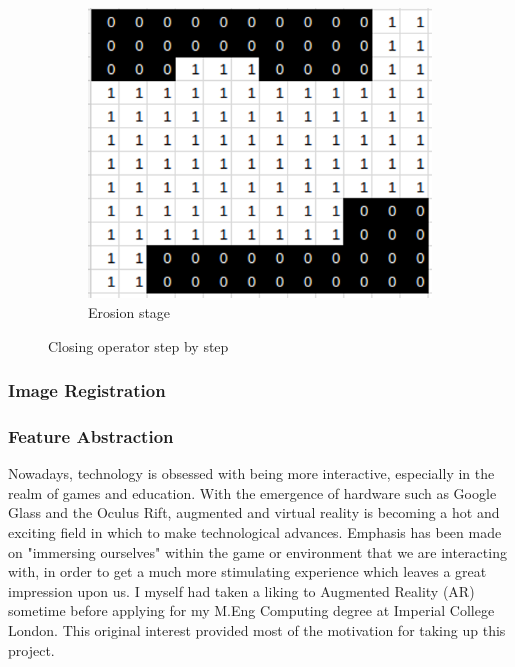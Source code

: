 \documentclass[11pt]{report}
\begin{document}
\begin{figure}
\begin{subfigure}{.32\textwidth}
		\centering
		\includegraphics[scale=0.27]{pics/closing_e}
		\caption{Erosion stage}
	\end{subfigure}
	\caption{Closing operator step by step}
	\label{fig:closing}
\end{figure}



\subsubsection*{Image Registration}
\subsubsection*{Feature Abstraction}








Nowadays, technology is obsessed with being more interactive, especially in 
the realm of games and education. With the emergence of hardware such as
Google Glass and the Oculus Rift, augmented and virtual reality is becoming
a hot and exciting field in which to make technological advances. Emphasis
has been made on "immersing ourselves" within the game or environment that
we are interacting with, in order to get a much more stimulating experience
which leaves a great impression upon us. I myself had taken a liking to 
Augmented Reality (AR) sometime before applying for my M.Eng Computing degree
at Imperial College London. This original interest provided most of the 
motivation for taking up this project.
\end{document}
